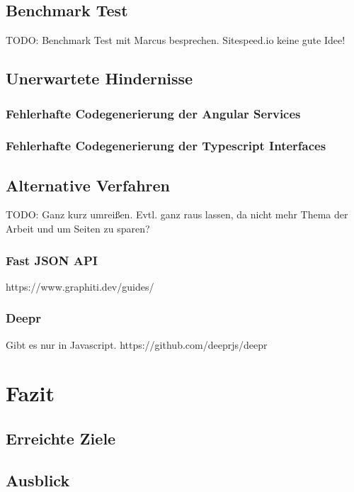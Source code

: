 \section{Benchmark Test}
TODO: Benchmark Test mit Marcus besprechen. Sitespeed.io keine gute Idee!
\section{Unerwartete Hindernisse}
\subsection{Fehlerhafte Codegenerierung der Angular Services}
\subsection{Fehlerhafte Codegenerierung der Typescript Interfaces}



\section{Alternative Verfahren}
TODO: Ganz kurz umreißen. Evtl. ganz raus lassen, da nicht mehr Thema der Arbeit und um Seiten zu sparen?
\subsection{Fast JSON API}

https://www.graphiti.dev/guides/
\subsection{Deepr}
Gibt es nur in Javascript.
https://github.com/deeprjs/deepr


\chapter{Fazit}
\section{Erreichte Ziele}
\section{Ausblick}

